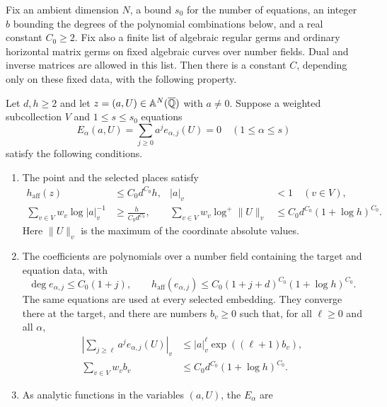 \begin{theorem}\label{int:height}
Fix an ambient dimension $N$, a bound $s_0$ for the number of equations,
an integer $b$ bounding the degrees of the polynomial combinations below,
and a real constant $C_0\geq2$.  Fix also a finite list of algebraic regular
germs and ordinary horizontal matrix germs on fixed algebraic curves over
number fields.  Dual and inverse matrices are allowed in this list.
Then there is a constant $C$, depending only on these fixed data, with the
following property.

Let $d,h\geq2$ and let $z=(a,U)\in\mathbb A^N(\overline{\mathbb Q})$ with $a\ne0$.
Suppose a weighted subcollection $V$ and $1\leq s\leq s_0$ equations
\begin{equation}\label{int:equations}
 E_\alpha(a,U)=\sum_{j\geq0}a^j e_{\alpha,j}(U)=0
 \quad(1\leq\alpha\leq s)
\end{equation}
satisfy the following conditions.
\begin{enumerate}[label=\textup{(\roman*)}]
\item The point and the selected places satisfy
\begin{align}
 h_{\mathrm{aff}}(z)&\leq C_0d^{C_0}h,
 &|a|_v&<1\quad(v\in V),\label{int:global-input}\\
 \sum_{v\in V}w_v\log |a|_v^{-1}
   &\geq \frac{h}{C_0d^{C_0}},
 &\sum_{v\in V}w_v\log^+\|U\|_v
   &\leq C_0d^{C_0}(1+\log h)^{C_0}.
 \label{int:local-input}
\end{align}
Here $\|U\|_v$ is the maximum of the coordinate absolute values.
\item The coefficients are polynomials over a number field containing the
target and equation data, with
\begin{equation}\label{int:coefficient-input}
 \deg e_{\alpha,j}\leq C_0(1+j),\qquad
 h_{\mathrm{aff}}(e_{\alpha,j})
  \leq C_0(1+j+d)^{C_0}(1+\log h)^{C_0}.
\end{equation}
The same equations are used at every selected embedding.  They converge
there at the target, and there are numbers $b_v\geq0$ such that, for all
$\ell\geq0$ and all $\alpha$,
\begin{align}
 \left|\sum_{j\geq\ell}a^j e_{\alpha,j}(U)\right|_v
   &\leq |a|_v^\ell\exp((\ell+1)b_v),\label{int:tail-input}\\
 \sum_{v\in V}w_vb_v
   &\leq C_0d^{C_0}(1+\log h)^{C_0}.
\end{align}
\item As analytic functions in the variables $(a,U)$, the $E_\alpha$ are

\end{enumerate}
\end{theorem}
